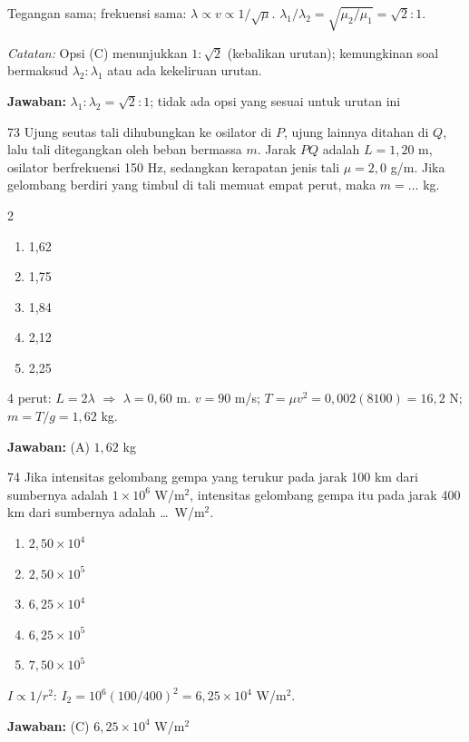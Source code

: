 \documentclass[11pt]{article}
\newenvironment{pil}{%
  \begin{enumerate}[label=(\Alph*),leftmargin=*,itemsep=1pt,topsep=3pt]}%
  {\end{enumerate}}
\newenvironment{pilB}{%
  \par\smallskip\begin{multicols}{2}
  \begin{enumerate}[label=(\Alph*),leftmargin=*,itemsep=1pt,topsep=3pt]}%
  {\end{enumerate}\end{multicols}}
\newcommand{\jawaban}[1]{%
  \noindent\colorbox{gold!30}{\parbox{\dimexpr\linewidth-2\fboxsep\relax}{%
    \textbf{Jawaban:} #1}}\par\smallskip}
\begin{document}
\begin{pembox}
Tegangan sama; frekuensi sama: $\lambda\propto v\propto1/\sqrt{\mu}$. $\lambda_1/\lambda_2=\sqrt{\mu_2/\mu_1}=\sqrt{2}:1$.

\textit{Catatan:} Opsi (C) menunjukkan $1:\sqrt{2}$ (kebalikan urutan); kemungkinan soal bermaksud $\lambda_2:\lambda_1$ atau ada kekeliruan urutan.
\jawaban{$\lambda_1:\lambda_2=\sqrt{2}:1$; tidak ada opsi yang sesuai untuk urutan ini}
\end{pembox}

\begin{soal}{73}
Ujung seutas tali dihubungkan ke osilator di $P$, ujung lainnya ditahan
di $Q$, lalu tali ditegangkan oleh beban bermassa $m$. Jarak $PQ$
adalah $L=1{,}20$ m, osilator berfrekuensi 150 Hz, sedangkan kerapatan
jenis tali $\mu=2{,}0$ g/m. Jika gelombang berdiri yang timbul di tali
memuat empat perut, maka $m=\ldots$ kg.
\begin{pilB}
  \item 1,62 \item 1,75 \item 1,84 \item 2,12 \item 2,25
\end{pilB}
\end{soal}

\begin{pembox}
4 perut: $L=2\lambda$ $\Rightarrow$ $\lambda=0{,}60$ m. $v=90$ m/s; $T=\mu v^2=0{,}002(8100)=16{,}2$ N; $m=T/g=1{,}62$ kg.
\jawaban{(A) $1{,}62$ kg}
\end{pembox}

\begin{soal}{74}
Jika intensitas gelombang gempa yang terukur pada jarak 100 km dari
sumbernya adalah $1\times10^{6}$ W/m$^2$, intensitas gelombang gempa
itu pada jarak 400 km dari sumbernya adalah \ldots\ W/m$^2$.
\begin{pil}
  \item $2{,}50\times10^4$ \item $2{,}50\times10^5$ \item $6{,}25\times10^4$
  \item $6{,}25\times10^5$ \item $7{,}50\times10^5$
\end{pil}
\end{soal}

\begin{pembox}
$I\propto1/r^2$: $I_2=10^6(100/400)^2=6{,}25\times10^4$ W/m$^2$.
\jawaban{(C) $6{,}25\times10^4$ W/m$^2$}
\end{pembox}
\end{document}
